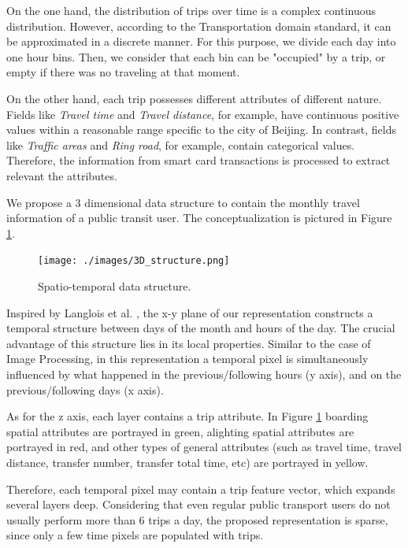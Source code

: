 \documentclass{article}
\begin{document}
On the one hand, the distribution of trips over time is a complex continuous distribution. However, according to the Transportation domain standard, it can be approximated in a discrete manner. For this purpose, we divide each day into one hour bins. Then, we consider that each bin can be "occupied" by a trip, or empty if there was no traveling at that moment. 

On the other hand, each trip possesses different attributes of different nature. Fields like \textit{Travel time} and \textit{Travel distance}, for example, have continuous positive values within a reasonable range specific to the city of Beijing. In contrast, fields like \textit{Traffic areas} and \textit{Ring road}, for example, contain categorical values. Therefore, the information from smart card transactions is processed to extract relevant the attributes. 

We propose a 3 dimensional data structure to contain the monthly travel information of a public transit user. The conceptualization is pictured in Figure \ref{fig:data_mining/3D_structure}.

\begin{figure}[H]
  \centering
  \texttt{[image: ./images/3D\_structure.png]}
  \caption{Spatio-temporal data structure.}
  \label{fig:data_mining/3D_structure}
\end{figure}

Inspired by Langlois et al. \cite{langlois2016inferring}, the x-y plane of our representation constructs a temporal structure between days of the month and hours of the day. The crucial advantage of this structure lies in its local properties. Similar to the case of Image Processing, in this representation a temporal pixel is simultaneously influenced by what happened in the previous/following hours (y axis), and on the previous/following days (x axis).

As for the z axis, each layer contains a trip attribute. In Figure \ref{fig:data_mining/3D_structure} boarding spatial attributes are portrayed in green, alighting spatial attributes are portrayed in red, and other types of general attributes (such as travel time, travel distance, transfer number, transfer total time, etc) are portrayed in yellow. 

Therefore, each temporal pixel may contain a trip feature vector, which expands several layers deep. Considering that even regular public transport users do not usually perform more than 6 trips a day, the proposed representation is sparse, since only a few time pixels are populated with trips.  
\end{document}

